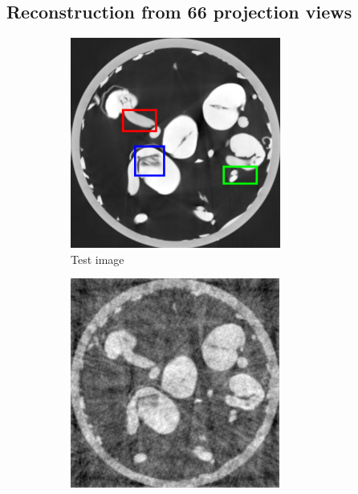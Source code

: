 \documentclass{article}
\begin{document}
\newpage
\subsection{Reconstruction from 66 projection views}
\begin{figure}[h]
    \begin{subfigure}[b]{0.3\linewidth}
        \includegraphics[width=\textwidth]{../images/supplementary/2D_sprouts/colorTestIm.png}
        \caption{Test image}
     \end{subfigure}
    \begin{subfigure}[b]{0.3\linewidth}
        \includegraphics[width=\textwidth]{../images/supplementary/2D_sprouts/55_angles/1/fbp.png}

\end{subfigure}
\end{figure}
\end{document}
